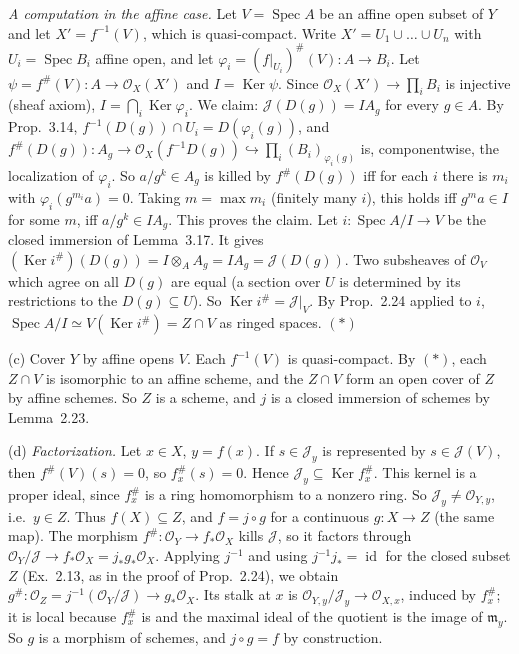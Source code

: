 \documentclass[11pt]{article}
\begin{document}
\emph{A computation in the affine case.} Let $V=\operatorname{Spec}A$ be an affine open subset of $Y$ and let $X'=f^{-1}(V)$, which is quasi-compact. Write $X'=U_1\cup\dots\cup U_n$ with $U_i=\operatorname{Spec}B_i$ affine open, and let $\varphi_i=(f|_{U_i})^\#(V):A\to B_i$. Let $\psi=f^\#(V):A\to\mathcal{O}_X(X')$ and $I=\operatorname{Ker}\psi$. Since $\mathcal{O}_X(X')\to\prod_i B_i$ is injective (sheaf axiom), $I=\bigcap_i\operatorname{Ker}\varphi_i$. We claim: $\mathcal{J}(D(g))=IA_g$ for every $g\in A$. By Prop.~3.14, $f^{-1}(D(g))\cap U_i=D(\varphi_i(g))$, and $f^\#(D(g)):A_g\to\mathcal{O}_X(f^{-1}D(g))\hookrightarrow\prod_i(B_i)_{\varphi_i(g)}$ is, componentwise, the localization of $\varphi_i$. So $a/g^k\in A_g$ is killed by $f^\#(D(g))$ iff for each $i$ there is $m_i$ with $\varphi_i(g^{m_i}a)=0$. Taking $m=\max m_i$ (finitely many $i$), this holds iff $g^ma\in I$ for some $m$, iff $a/g^k\in IA_g$. This proves the claim. Let $i:\operatorname{Spec}A/I\to V$ be the closed immersion of Lemma~3.17. It gives $(\operatorname{Ker}i^\#)(D(g))=I\otimes_AA_g=IA_g=\mathcal{J}(D(g))$. Two subsheaves of $\mathcal{O}_V$ which agree on all $D(g)$ are equal (a section over $U$ is determined by its restrictions to the $D(g)\subseteq U$). So $\operatorname{Ker}i^\#=\mathcal{J}|_V$. By Prop.~2.24 applied to $i$, $\operatorname{Spec}A/I\simeq V(\operatorname{Ker}i^\#)=Z\cap V$ as ringed spaces. $(\ast)$

(c) Cover $Y$ by affine opens $V$. Each $f^{-1}(V)$ is quasi-compact. By $(\ast)$, each $Z\cap V$ is isomorphic to an affine scheme, and the $Z\cap V$ form an open cover of $Z$ by affine schemes. So $Z$ is a scheme, and $j$ is a closed immersion of schemes by Lemma~2.23.

(d) \emph{Factorization.} Let $x\in X$, $y=f(x)$. If $s\in\mathcal{J}_y$ is represented by $s\in\mathcal{J}(V)$, then $f^\#(V)(s)=0$, so $f^\#_x(s)=0$. Hence $\mathcal{J}_y\subseteq\operatorname{Ker}f^\#_x$. This kernel is a proper ideal, since $f^\#_x$ is a ring homomorphism to a nonzero ring. So $\mathcal{J}_y\ne\mathcal{O}_{Y,y}$, i.e.\ $y\in Z$. Thus $f(X)\subseteq Z$, and $f=j\circ g$ for a continuous $g:X\to Z$ (the same map). The morphism $f^\#:\mathcal{O}_Y\to f_*\mathcal{O}_X$ kills $\mathcal{J}$, so it factors through $\mathcal{O}_Y/\mathcal{J}\to f_*\mathcal{O}_X=j_*g_*\mathcal{O}_X$. Applying $j^{-1}$ and using $j^{-1}j_*=\operatorname{id}$ for the closed subset $Z$ (Ex.~2.13, as in the proof of Prop.~2.24), we obtain $g^\#:\mathcal{O}_Z=j^{-1}(\mathcal{O}_Y/\mathcal{J})\to g_*\mathcal{O}_X$. Its stalk at $x$ is $\mathcal{O}_{Y,y}/\mathcal{J}_y\to\mathcal{O}_{X,x}$, induced by $f^\#_x$; it is local because $f^\#_x$ is and the maximal ideal of the quotient is the image of $\mathfrak m_y$. So $g$ is a morphism of schemes, and $j\circ g=f$ by construction.
\end{document}
